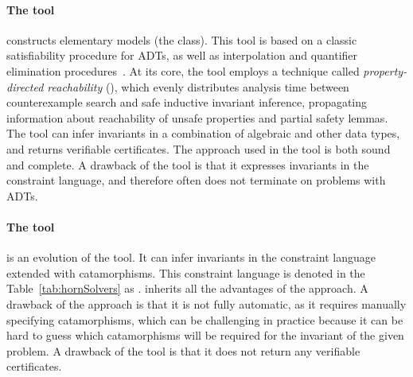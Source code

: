 \paragraph{The \spacer{} tool~\cite{komuravelli2016smt}} constructs elementary models (the \elemclass{} class). This tool is based on a classic satisfiability procedure for ADTs, as well as interpolation and quantifier elimination procedures~\cite{bjorner2015playing}. At its core, the tool employs a technique called \emph{property-directed reachability} (\pdr{}), which evenly distributes analysis time between counterexample search and safe inductive invariant inference, propagating information about reachability of unsafe properties and partial safety lemmas. The tool can infer invariants in a combination of algebraic and other data types, and returns verifiable certificates. The approach used in the tool is both sound and complete. A drawback of the tool is that it expresses invariants in the constraint language, and therefore often does not terminate on problems with ADTs.

\paragraph{The \racer{} tool~\cite{10.1145/3498722}} is an evolution of the \spacer{} tool. It can infer invariants in the constraint language extended with catamorphisms. This constraint language is denoted in the Table~\ref{tab:hornSolvers} as \catelemclass{}. \racer{} inherits all the advantages of the \spacer{} approach. A drawback of the approach is that it is not fully automatic, as it requires manually specifying catamorphisms, which can be challenging in practice because it can be hard to guess which catamorphisms will be required for the invariant of the given problem. A drawback of the tool is that it does not return any verifiable certificates.

